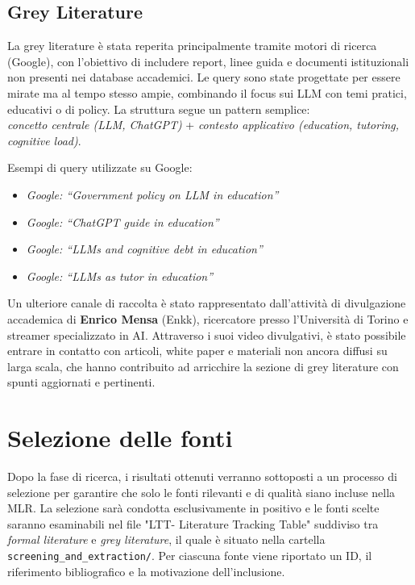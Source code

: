 \documentclass[a4paper,9pt]{article}
\begin{document}
	\subsection{Grey Literature}
	
	La grey literature è stata reperita principalmente tramite motori di ricerca (Google), con l’obiettivo di includere report, linee guida e documenti istituzionali non presenti nei database accademici. Le query sono state progettate per essere mirate ma al tempo stesso ampie, combinando il focus sui LLM con temi pratici, educativi o di policy. La struttura segue un pattern semplice:\\ \emph{concetto centrale (LLM, ChatGPT)} + \emph{contesto applicativo (education, tutoring, cognitive load)}.  
	
	Esempi di query utilizzate su Google:
	\begin{itemize}
		\item \emph{Google: ``Government policy on LLM in education''}
		\item \emph{Google: ``ChatGPT guide in education''}
		\item \emph{Google: ``LLMs and cognitive debt in education''}
		\item \emph{Google: ``LLMs as tutor in education''}
	\end{itemize}
	Un ulteriore canale di raccolta è stato rappresentato dall’attività di divulgazione accademica di \textbf{Enrico Mensa} (Enkk), ricercatore presso l’Università di Torino e streamer specializzato in AI. Attraverso i suoi video divulgativi, è stato possibile entrare in contatto con articoli, white paper e materiali non ancora diffusi su larga scala, che hanno contribuito ad arricchire la sezione di grey literature con spunti aggiornati e pertinenti.

	\section{Selezione delle fonti}
	
	Dopo la fase di ricerca, i risultati ottenuti verranno sottoposti a un processo di selezione per garantire che solo le fonti rilevanti e di qualità siano incluse nella MLR.
	La selezione sarà condotta esclusivamente in positivo e le fonti scelte saranno esaminabili nel file "LTT- Literature Tracking Table" suddiviso tra \emph{formal literature} e \emph{grey literature}, 
	il quale è situato nella cartella \texttt{screening\_and\_extraction/}. 
	Per ciascuna fonte viene riportato un ID, il riferimento bibliografico e la motivazione dell’inclusione.
	
\end{document}
